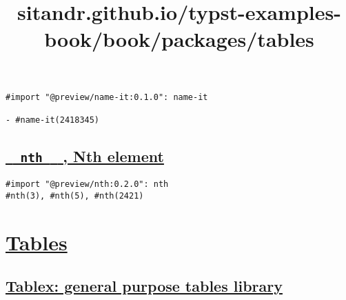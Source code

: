 \begin{verbatim}
#import "@preview/name-it:0.1.0": name-it

- #name-it(2418345)
\end{verbatim}

\pandocbounded{}

\subsection{\texorpdfstring{\hyperref[nth-nth-element]{\texttt{\ }{\texttt{\ nth\ }}\texttt{\ }
, Nth element}}{  nth   , Nth element}}\label{nth-nth-element}

\begin{verbatim}
#import "@preview/nth:0.2.0": nth
#nth(3), #nth(5), #nth(2421)
\end{verbatim}

\pandocbounded{}


\title{sitandr.github.io/typst-examples-book/book/packages/tables}

\section{\texorpdfstring{\hyperref[tables]{Tables}}{Tables}}\label{tables}

\subsection{\texorpdfstring{\hyperref[tablex-general-purpose-tables-library]{Tablex:
general purpose tables
library}}{Tablex: general purpose tables library}}\label{tablex-general-purpose-tables-library}

